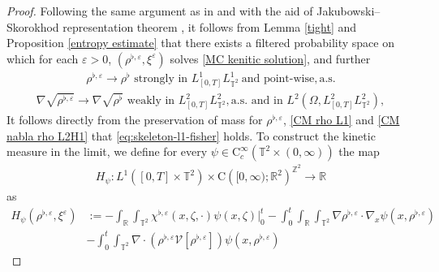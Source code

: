 \begin{proof}
Following the same argument as in \cite[Theorem 5.29]{FG21} and with the aid of Jakubowski--Skorokhod representation theorem \cite{}, it follows from Lemma \ref{tight} and Proposition \ref{entropy estimate} that there exists a filtered probability space on which for each $\varepsilon > 0$, $(\rho^{\flat, \varepsilon}, \xi^{\varepsilon})$ solves \eqref{MC kenitic solution}, and further
%
\begin{align}\label{CM rho L1}
\rho^{\flat,\varepsilon}\rightarrow \rho^{\flat}\text { strongly in } L^1_{[0, T]}L^1_{\mathbb{T}^2} \ \text{and point-wise}, \text{a.s.}
\end{align}
%
\begin{align}\label{CM nabla rho L2H1}
\nabla\sqrt{\rho^{\flat,\varepsilon}} \rightarrow \nabla \sqrt{\rho^{\flat}} \text{ weakly in } L^2_{[0, T]} L^2_{\mathbb{T}^2}, \text{a.s.} \text{ and in } L^2(\Omega, L^2_{[0, T]} L^2_{\mathbb{T}^2}),
\end{align}
%
It follows directly from the preservation of mass for $\rho^{\flat, \varepsilon}$, \eqref{CM rho L1} and \eqref{CM nabla rho L2H1} that \eqref{eq:skeleton-l1-fisher} holds. To construct the kinetic measure in the limit, we define for every $\psi\in\mathrm{C}_{c}^{\infty}\left(\mathbb{T}^2\times(0,\infty)\right)$ the map 
\begin{align*}
H_{\psi}:L^{1}\left([0, T] \times \mathbb{T}^2\right)\times \mathrm{C}\left([0, \infty) ; \mathbb{R}^2\right)^{\mathbb{Z}^{2}}\rightarrow\mathbb{R}
\end{align*}
as
\begin{align}
H_{\psi}(\rho^{\flat,\varepsilon},\xi^{\varepsilon}) & := - \int_{\mathbb{R}}\int_{\mathbb{T}^2} \chi^{\flat,\varepsilon}(x, \zeta, \cdot) \psi(x, \zeta)\Big|_0^t - \int_{0}^{t} \int_{\mathbb{R}} \int_{\mathbb{T}^2}\nabla \rho^{\flat,\varepsilon}\cdot\nabla_x\psi(x,\rho^{\flat,\varepsilon})
\nonumber\\
& - \int_{0}^{t} \int_{\mathbb{T}^2} \nabla \cdot (\rho^{\flat,\varepsilon} \mathcal{V}[\rho^{\flat,\varepsilon}])\psi(x, \rho^{\flat,\varepsilon})

\end{align}
\end{proof}
